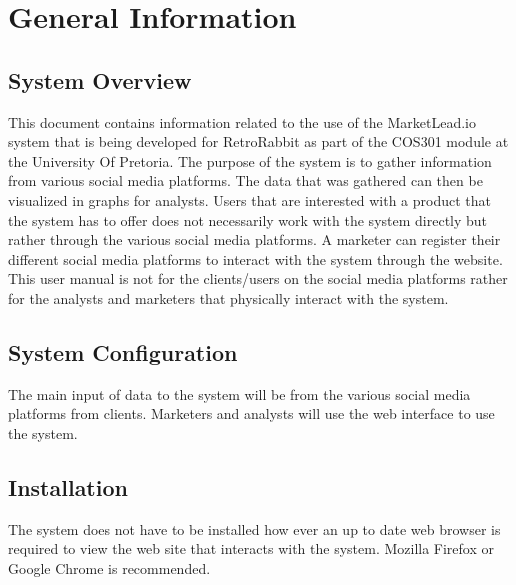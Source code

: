 \documentclass{article}
\begin{document}
	\cleardoublepage
	\tableofcontents
	\cleardoublepage
	
	\section{General Information}
		\subsection{System Overview} %
			This document contains information related to the use of the MarketLead.io system that is being developed for RetroRabbit as part of the COS301 module at the University Of Pretoria. 
			The purpose of the system is to gather information from various social media platforms. The data that was gathered can then be visualized in graphs for analysts.
			Users that are interested with a product that the system has to offer does not necessarily work with the system directly but rather through the various social media platforms.
			A marketer can register their different social media platforms to interact with the system through the website.
			This user manual is not for the clients/users on the social media platforms rather for the analysts and marketers that physically interact with the system.

		\subsection{System Configuration}%
			The main input of data to the system will be from the various social media platforms from clients. Marketers and analysts will use the web interface to use the system.

		\subsection{Installation}%
			The system does not have to be installed how ever an up to date web browser is required to view the web site that interacts with the system. Mozilla Firefox or Google Chrome is recommended.
\end{document}
